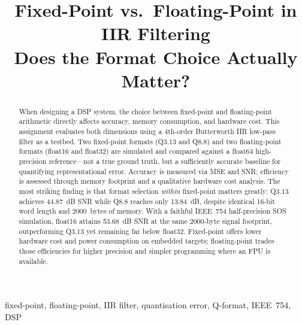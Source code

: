 \documentclass[conference]{IEEEtran}
\begin{document}
\title{Fixed-Point vs.\ Floating-Point in IIR Filtering\\Does the Format Choice Actually Matter?}

\author{
\and
{}
\and
{}
}

\maketitle

\begin{abstract}
When designing a DSP system, the choice between fixed-point and floating-point arithmetic directly affects accuracy, memory consumption, and hardware cost. This assignment evaluates both dimensions using a 4th-order Butterworth IIR low-pass filter as a testbed. Two fixed-point formats (Q3.13 and Q8.8) and two floating-point formats (float16 and float32) are simulated and compared against a float64 high-precision reference---not a true ground truth, but a sufficiently accurate baseline for quantifying representational error. Accuracy is measured via MSE and SNR; efficiency is assessed through memory footprint and a qualitative hardware cost analysis. The most striking finding is that format selection \emph{within} fixed-point matters greatly: Q3.13 achieves 44.87~dB SNR while Q8.8 reaches only 13.84~dB, despite identical 16-bit word length and 2000~bytes of memory. With a faithful IEEE~754 half-precision SOS simulation, float16 attains 53.68~dB SNR at the same 2000-byte signal footprint, outperforming Q3.13 yet remaining far below float32. Fixed-point offers lower hardware cost and power consumption on embedded targets; floating-point trades those efficiencies for higher precision and simpler programming where an FPU is available.
\end{abstract}

\begin{IEEEkeywords}
fixed-point, floating-point, IIR filter, quantisation error, Q-format, IEEE~754, DSP
\end{IEEEkeywords}
\end{document}
